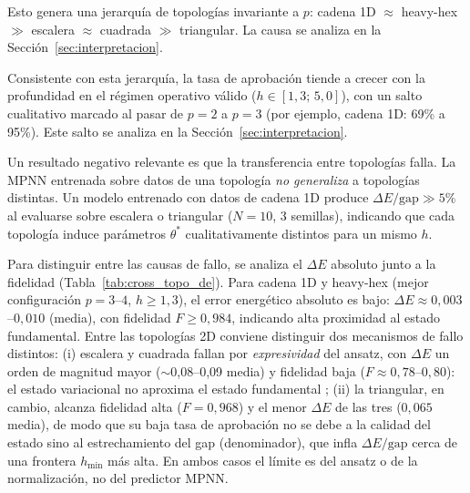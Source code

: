 \documentclass[11pt,a4paper,spanish]{book}
\begin{document}
Esto genera una jerarquía de topologías invariante a $p$: cadena 1D $\approx$ heavy-hex $\gg$ escalera $\approx$ cuadrada $\gg$ triangular. La causa se analiza en la Sección~\ref{sec:interpretacion}.

Consistente con esta jerarquía, la tasa de aprobación tiende a crecer con la profundidad en el régimen operativo válido ($h \in [1{,}3;\, 5{,}0]$), con un salto cualitativo marcado al pasar de $p = 2$ a $p = 3$ (por ejemplo, cadena 1D: 69\% a 95\%). Este salto se analiza en la Sección~\ref{sec:interpretacion}.

Un resultado negativo relevante es que la transferencia entre topologías falla. La MPNN entrenada sobre datos de una topología \emph{no generaliza} a topologías distintas. Un modelo entrenado con datos de cadena 1D produce $\Delta E/\text{gap} \gg 5\%$ al evaluarse sobre escalera o triangular ($N = 10$, 3 semillas), indicando que cada topología induce parámetros $\theta^*$ cualitativamente distintos para un mismo $h$.

Para distinguir entre las causas de fallo, se analiza el $\Delta E$ absoluto junto a la fidelidad (Tabla~\ref{tab:cross_topo_de}). Para cadena 1D y heavy-hex (mejor configuración $p=3$--$4$, $h \geq 1,3$), el error energético absoluto es bajo: $\Delta E \approx 0,003$--$0,010$ (media), con fidelidad $F \geq 0,984$, indicando alta proximidad al estado fundamental. Entre las topologías 2D conviene distinguir dos mecanismos de fallo distintos: (i) escalera y cuadrada fallan por \emph{expresividad} del ansatz, con $\Delta E$ un orden de magnitud mayor ($\sim$0,08--0,09 media) y fidelidad baja ($F \approx 0,78$--$0,80$): el estado variacional no aproxima el estado fundamental \citep{tripathi2026}; (ii) la triangular, en cambio, alcanza fidelidad alta ($F = 0,968$) y el menor $\Delta E$ de las tres ($0,065$ media), de modo que su baja tasa de aprobación no se debe a la calidad del estado sino al estrechamiento del gap (denominador), que infla $\Delta E/\text{gap}$ cerca de una frontera $h_{\min}$ más alta. En ambos casos el límite es del ansatz o de la normalización, no del predictor MPNN.
\end{document}
